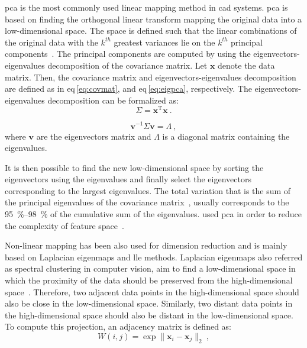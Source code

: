 \ac{pca} is the most commonly used linear mapping method in \ac{cad} systems.
\ac{pca} is based on finding the orthogonal linear transform mapping the original data into a low-dimensional space.
The space is defined such that the linear combinations of the original data with the $k^{th}$ greatest variances lie on the $k^{th}$ principal components~\cite{Jolliffe2002}.
The principal components are computed by using the eigenvectors-eigenvalues decomposition of the covariance matrix.
Let $\mathbf{x}$ denote the data matrix.
Then, the covariance matrix and eigenvectors-eigenvalues decomposition are defined as in \acs{eq}\,\eqref{eq:covmat}, and \acs{eq}\,\eqref{eq:eigpca}, respectively. 
The eigenvectors-eigenvalues decomposition can be formalized as:
\begin{equation}
  \Sigma = \mathbf{x}^{\text{T}} \mathbf{x} \ .
  \label{eq:covmat}
\end{equation}

\begin{equation}
  \mathbf{v}^{-1} \Sigma \mathbf{v} = \Lambda \ ,
  \label{eq:eigpca}
\end{equation}
\noindent where $\mathbf{v}$ are the eigenvectors matrix and $\Lambda$ is a diagonal matrix containing the eigenvalues. 

It is then possible to find the new low-dimensional space by sorting the eigenvectors using the eigenvalues and finally select the eigenvectors corresponding to the largest eigenvalues.
The total variation that is the sum of the principal eigenvalues of the covariance matrix~\cite{Fodor2002}, usually corresponds to the \SIrange{95}{98}{\percent} of the cumulative sum of the eigenvalues.
\citeauthor{Tiwari2012} used \ac{pca} in order to reduce the complexity of feature space~\cite{Tiwari2008,Tiwari2009,Tiwari2012}.

Non-linear mapping has been also used for dimension reduction and is mainly based on Laplacian eigenmaps and \acf{lle} methods.
Laplacian eigenmaps also referred as spectral clustering in computer vision, aim to find a low-dimensional space in which the proximity of the data should be preserved from the high-dimensional space~\cite{Shi2000,Belkin2001}.
Therefore, two adjacent data points in the high-dimensional space should also be close in the low-dimensional space.
Similarly, two distant data points in the high-dimensional space should also be distant in the low-dimensional space.
To compute this projection, an adjacency matrix is defined as:
\begin{equation}
	W(i,j) = \exp \| \mathbf{x}_i - \mathbf{x}_j \|_2 \ ,
	\label{eq:gew}
\end{equation}

